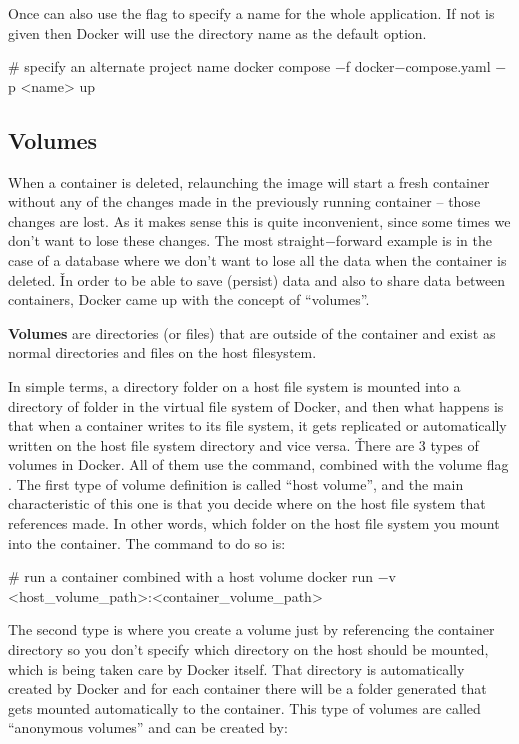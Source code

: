 Once can also use the \code{$-$p]} flag to specify a name for the whole application. If not is given then Docker will
use the directory name as the default option.

\begin{bash}
# specify an alternate project name
docker compose $-$f docker$-$compose.yaml $-$p <name> up
\end{bash}

\subsection{Volumes}

When a container is deleted, relaunching the image will start a fresh container without any of the changes made in
the previously running container -- those changes are lost. As it makes sense this is quite inconvenient, since some
times we don't want to lose these changes. The most straight$-$forward example is in the case of a database where we
don't want to lose all the data when the container is deleted. \v

In order to be able to save (persist) data and also to share data between containers, Docker came up with the concept
of ``volumes''.

\bd[Volumes]
\textbf{Volumes} are directories (or files) that are outside of the container and exist as normal directories and files
on the host filesystem.
\ed

In simple terms, a directory folder on a host file system is mounted into a directory of folder in the virtual file
system of Docker, and then what happens is that when a container writes to its file system, it gets replicated or
automatically written on the host file system directory and vice versa. \v

There are 3 types of volumes in Docker. All of them use the  command, combined with the volume flag
. The first type of volume definition is called ``host volume'', and the main characteristic of this one
is that you decide where on the host file system that references made. In other words, which folder on the host file
system you mount into the container. The command to do so is:

\begin{bash}
# run a container combined with a host volume
docker run $-$v <host_volume_path>:<container_volume_path>
\end{bash}

The second type is where you create a volume just by referencing the container directory so you don't specify which
directory on the host should be mounted, which is being taken care by Docker itself. That directory is automatically
created by Docker and for each container there will be a folder generated that gets mounted automatically to the
container. This type of volumes are called ``anonymous volumes'' and can be created by:

